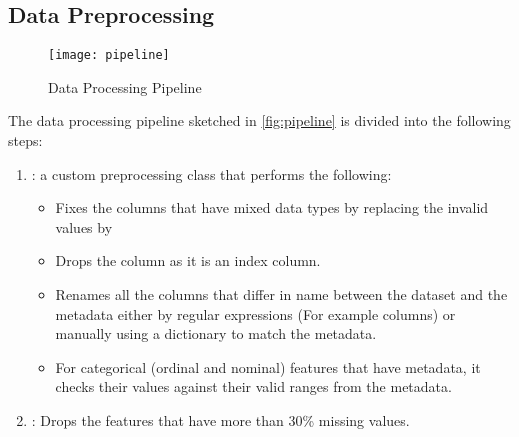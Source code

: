 \documentclass[a4paper]{article}
\begin{document}
{    \subsection{Data Preprocessing}
    \label{sec:data-preprocessing}

    \begin{figure}[H]
      \centering
      \caption{Data Processing Pipeline}
      \label{fig:pipeline}
      \texttt{[image: pipeline]}
    \end{figure}

    
    The data processing pipeline sketched in \autoref{fig:pipeline} is divided into the following steps:

    \begin{enumerate}
    \item {}: a custom preprocessing class that performs the following:
      \begin{itemize}

      \item Fixes the columns that have mixed data types  by replacing the invalid values \code{['X', 'XX']} by 

      \item Drops the \code{['LNR']} column as it is an index column.

      \item Renames all the columns that differ in name between the dataset and the metadata either by regular expressions (For example  columns) or manually using a dictionary to match the metadata.
        
      \item For categorical (ordinal and nominal) features that have metadata, it checks their values against their valid ranges from the metadata.
      \end{itemize}
    \item {}: Drops the features that have more than 30\% missing values.
      

\end{enumerate}}
\end{document}
